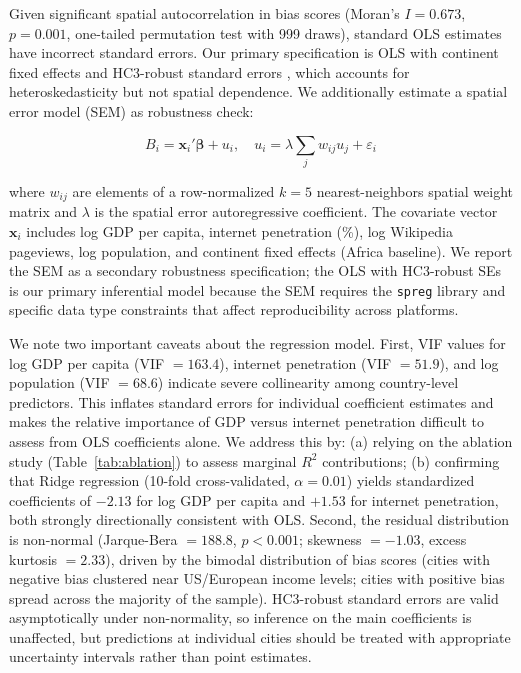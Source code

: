 \documentclass[12pt]{article}
\begin{document}
Given significant spatial autocorrelation in bias scores (Moran's $I = 0.673$, $p = 0.001$, one-tailed permutation test with 999 draws), standard OLS estimates have incorrect standard errors. Our primary specification is OLS with continent fixed effects and HC3-robust standard errors \citep{long2000using}, which accounts for heteroskedasticity but not spatial dependence. We additionally estimate a spatial error model (SEM) \citep{anselin1995local} as robustness check:

\begin{equation}
\label{eq:sem}
B_i = \mathbf{x}_i'\boldsymbol{\beta} + u_i, \quad u_i = \lambda \sum_j w_{ij} u_j + \varepsilon_i
\end{equation}

where $w_{ij}$ are elements of a row-normalized $k=5$ nearest-neighbors spatial weight matrix and $\lambda$ is the spatial error autoregressive coefficient. The covariate vector $\mathbf{x}_i$ includes log GDP per capita, internet penetration (\%), log Wikipedia pageviews, log population, and continent fixed effects (Africa baseline). We report the SEM as a secondary robustness specification; the OLS with HC3-robust SEs is our primary inferential model because the SEM requires the \texttt{spreg} library and specific data type constraints that affect reproducibility across platforms.

We note two important caveats about the regression model. First, VIF values for log GDP per capita (VIF $= 163.4$), internet penetration (VIF $= 51.9$), and log population (VIF $= 68.6$) indicate severe collinearity among country-level predictors. This inflates standard errors for individual coefficient estimates and makes the relative importance of GDP versus internet penetration difficult to assess from OLS coefficients alone. We address this by: (a) relying on the ablation study (Table~\ref{tab:ablation}) to assess marginal $R^2$ contributions; (b) confirming that Ridge regression (10-fold cross-validated, $\alpha = 0.01$) yields standardized coefficients of $-2.13$ for log GDP per capita and $+1.53$ for internet penetration, both strongly directionally consistent with OLS. Second, the residual distribution is non-normal (Jarque-Bera $= 188.8$, $p < 0.001$; skewness $= -1.03$, excess kurtosis $= 2.33$), driven by the bimodal distribution of bias scores (cities with negative bias clustered near US/European income levels; cities with positive bias spread across the majority of the sample). HC3-robust standard errors are valid asymptotically under non-normality, so inference on the main coefficients is unaffected, but predictions at individual cities should be treated with appropriate uncertainty intervals rather than point estimates.
\end{document}
